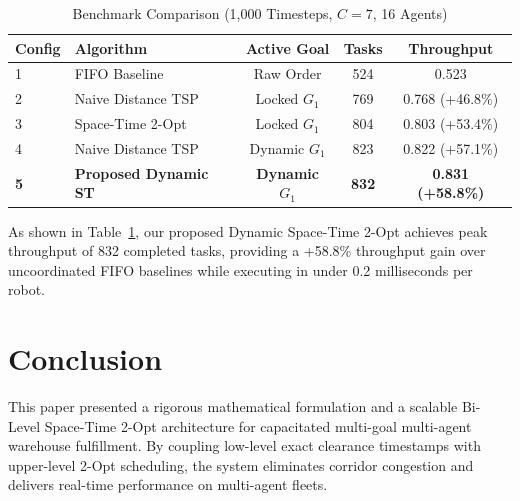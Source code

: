 \documentclass[journal]{IEEEtran}
\begin{document}
\begin{table}[h]
\centering
\caption{Benchmark Comparison (1,000 Timesteps, $C = 7$, 16 Agents)}
\label{tab:benchmarks}
\begin{tabular}{llccc}
\toprule
\textbf{Config} & \textbf{Algorithm} & \textbf{Active Goal} & \textbf{Tasks} & \textbf{Throughput} \\
\midrule
1 & FIFO Baseline & Raw Order & 524 & 0.523 \\
2 & Naive Distance TSP & Locked $G_1$ & 769 & 0.768 (+46.8\%) \\
3 & Space-Time 2-Opt & Locked $G_1$ & 804 & 0.803 (+53.4\%) \\
4 & Naive Distance TSP & Dynamic $G_1$ & 823 & 0.822 (+57.1\%) \\
\textbf{5} & \textbf{Proposed Dynamic ST} & \textbf{Dynamic $G_1$} & \textbf{832} & \textbf{0.831 (+58.8\%)} \\
\bottomrule
\end{tabular}
\end{table}

As shown in Table~\ref{tab:benchmarks}, our proposed Dynamic Space-Time 2-Opt achieves peak throughput of 832 completed tasks, providing a +58.8\% throughput gain over uncoordinated FIFO baselines while executing in under 0.2 milliseconds per robot.

\section{Conclusion}
This paper presented a rigorous mathematical formulation and a scalable Bi-Level Space-Time 2-Opt architecture for capacitated multi-goal multi-agent warehouse fulfillment. By coupling low-level exact clearance timestamps with upper-level 2-Opt scheduling, the system eliminates corridor congestion and delivers real-time performance on multi-agent fleets.
\end{document}
